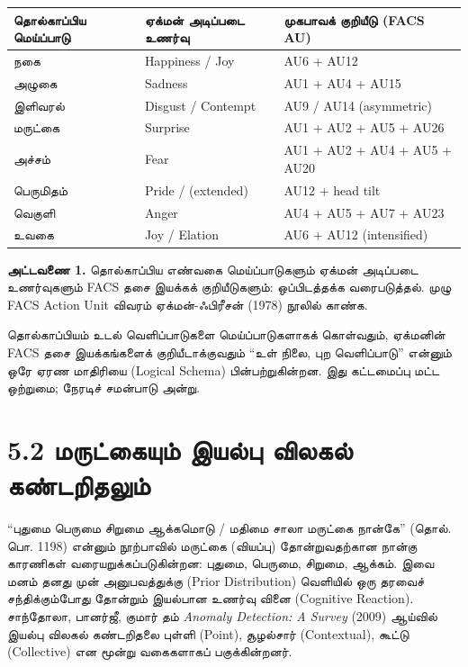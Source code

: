 \documentclass[journal,10pt,twocolumn]{IEEEtran}
\begin{document}
{\def\LTcaptype{none} %
\begin{table}[htbp]\centering
\begin{tabular}{l l l}
\toprule

தொல்காப்பிய மெய்ப்பாடு
 & 
ஏக்மன் அடிப்படை உணர்வு
 & 
முகபாவக் குறியீடு (FACS AU)
 \\
\midrule\noalign{}

\bottomrule\noalign{}

நகை & Happiness / Joy & AU6 + AU12 \\
அழுகை & Sadness & AU1 + AU4 + AU15 \\
இளிவரல் & Disgust / Contempt & AU9 / AU14 (asymmetric) \\
மருட்கை & Surprise & AU1 + AU2 + AU5 + AU26 \\
அச்சம் & Fear & AU1 + AU2 + AU4 + AU5 + AU20 \\
பெருமிதம் & Pride / (extended) & AU12 + head tilt \\
வெகுளி & Anger & AU4 + AU5 + AU7 + AU23 \\
உவகை & Joy / Elation & AU6 + AU12 (intensified) \\
\end{tabular}
\end{table}
}

\textbf{அட்டவணை 1.} தொல்காப்பிய எண்வகை மெய்ப்பாடுகளும் ஏக்மன் அடிப்படை உணர்வுகளும்
FACS தசை இயக்கக் குறியீடுகளும்: ஒப்பிடத்தக்க வரைபடுத்தல். முழு FACS Action Unit
விவரம் ஏக்மன்-ஃபிரீசன் (1978) நூலில் காண்க.

தொல்காப்பியம் உடல் வெளிப்பாடுகளை மெய்ப்பாடுகளாகக் கொள்வதும், ஏக்மனின் FACS தசை
இயக்கங்களைக் குறியீடாக்குவதும் “உள் நிலை, புற வெளிப்பாடு” என்னும் ஒரே ஏரண
மாதிரியை (Logical Schema) பின்பற்றுகின்றன. இது கட்டமைப்பு மட்ட ஒற்றுமை; நேரடிச்
சமன்பாடு அன்று.

\section{5.2 மருட்கையும் இயல்பு விலகல்
கண்டறிதலும்}\label{uxbaeuxbb0uxb9fuxb95uxbafuxbae-uxb87uxbafuxbb2uxbaa-uxbb5uxbb2uxb95uxbb2-uxb95uxba3uxb9fuxbb1uxba4uxbb2uxbae}

“புதுமை பெருமை சிறுமை ஆக்கமொடு / மதிமை சாலா மருட்கை நான்கே” (தொல். பொ.
1198) என்னும் நூற்பாவில் மருட்கை (வியப்பு) தோன்றுவதற்கான நான்கு காரணிகள்
வரையறுக்கப்படுகின்றன: புதுமை, பெருமை, சிறுமை, ஆக்கம். இவை மனம் தனது முன்
அனுபவத்துக்கு (Prior Distribution) வெளியில் ஒரு தரவைச் சந்திக்கும்போது தோன்றும்
இயல்பான உணர்வு வினை (Cognitive Reaction). சாந்தோலா, பானர்ஜீ, குமார் தம்
\emph{Anomaly Detection: A Survey} (2009) ஆய்வில் இயல்பு விலகல் கண்டறிதலை
புள்ளி (Point), சூழல்சார் (Contextual), கூட்டு (Collective) என மூன்று
வகைகளாகப் பகுக்கின்றனர்.
\end{document}
